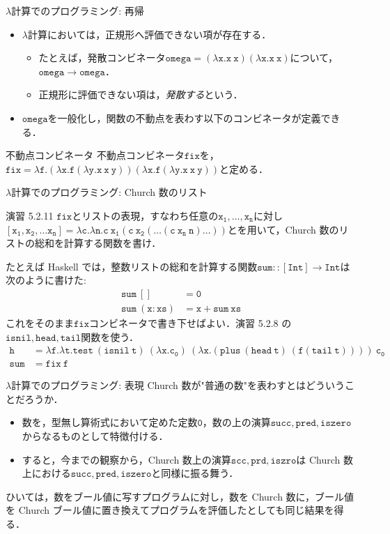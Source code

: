 \documentclass[9pt]{beamer}
\begin{document}
\begin{frame}{$\lambda$計算でのプログラミング: 再帰}
\begin{itemize}
	\item $\lambda$計算においては，正規形へ評価できない項が存在する．\begin{itemize}
		\item たとえば，発散コンビネータ$\mathtt{omega = (\lambda x.x\ x)(\lambda x. x\ x)}$について，$\mathtt{omega}\rightarrow\mathtt{omega}$．
		\item 正規形に評価できない項は，\textit{発散する}という．
	\end{itemize}
	\item $\mathtt{omega}$を一般化し，関数の不動点を表わす以下のコンビネータが定義できる．
\end{itemize}
\begin{dblock}{不動点コンビネータ}
	不動点コンビネータ$\mathtt{fix}$を，$\mathtt{fix = \lambda f. (\lambda x.f(\lambda y. x\ x\ y))(\lambda x. f(\lambda y.x\ x\ y))}$と定める．
\end{dblock}
\end{frame}
\begin{frame}{$\lambda$計算でのプログラミング: Church 数のリスト}
	\begin{tblock}{演習 5.2.11}
		$\mathtt{fix}$とリストの表現，すなわち任意の$\mathtt{x_{1},\ldots, x_{n}}$に対し$\mathtt{\left[x_{1},x_{2},\ldots x_{n}\right] = \lambda c.\lambda n. c\ x_{1}(c\ x_{2}(\ldots (c\ x_{n}\ n)\ldots))}$とを用いて，Church 数のリストの総和を計算する関数を書け．
	\end{tblock}
	たとえば Haskell では，整数リストの総和を計算する関数$\mathtt{sum :: \left[Int\right]\rightarrow Int}$は次のように書けた:
	\begin{align*}
		\mathtt{sum\ \left[\right]}&= \mathtt{0}\\
		\mathtt{sum\ (x:xs)} &= \mathtt{x + sum\ xs}
	\end{align*}
	これをそのまま$\mathtt{fix}$コンビネータで書き下せばよい．演習 5.2.8 の$\mathtt{isnil, head, tail}$関数を使う．
	\begin{align*}
		\mathtt{h} &= \mathtt{\lambda f. \lambda t. test\ (isnil\ t)\ (\lambda x. c_{0})\ (\lambda x.(plus\ (head\ t)\ (f (tail\ t))))\ c_{0}}\\
		\mathtt{sum} &=\mathtt{fix\ f}
	\end{align*}
\end{frame}
\begin{frame}{$\lambda$計算でのプログラミング: 表現}
	Church 数が"普通の数"を表わすとはどういうことだろうか．
\begin{itemize}
\item 数を，型無し算術式において定めた定数$\mathtt{0}$，数の上の演算$\mathtt{succ}, \mathtt{pred},\mathtt{iszero}$からなるものとして特徴付ける．
\item すると，今までの観察から，Church 数上の演算$\mathtt{scc},\mathtt{prd},\mathtt{iszro}$は Church 数上における$\mathtt{succ}, \mathtt{pred},\mathtt{iszero}$と同様に振る舞う．
\end{itemize}
ひいては，数をブール値に写すプログラムに対し，数を Church 数に，ブール値を Church ブール値に置き換えてプログラムを評価したとしても同じ結果を得る．
\end{frame}
\end{document}
